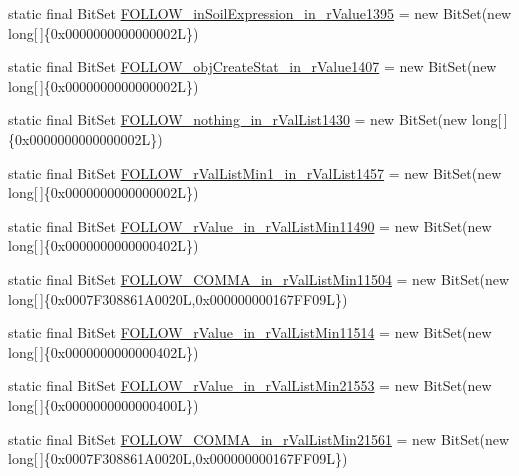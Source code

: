 \begin{DoxyCompactItemize}
\item 
static final Bit\-Set \hyperlink{classorg_1_1tzi_1_1use_1_1parser_1_1soil_1_1_soil_parser_aa564caac44be0568f6da097244165f9d}{F\-O\-L\-L\-O\-W\-\_\-in\-Soil\-Expression\-\_\-in\-\_\-r\-Value1395} = new Bit\-Set(new long\mbox{[}$\,$\mbox{]}\{0x0000000000000002\-L\})
\item 
static final Bit\-Set \hyperlink{classorg_1_1tzi_1_1use_1_1parser_1_1soil_1_1_soil_parser_a439c89ec7d9492b5d34920bc38cb5c40}{F\-O\-L\-L\-O\-W\-\_\-obj\-Create\-Stat\-\_\-in\-\_\-r\-Value1407} = new Bit\-Set(new long\mbox{[}$\,$\mbox{]}\{0x0000000000000002\-L\})
\item 
static final Bit\-Set \hyperlink{classorg_1_1tzi_1_1use_1_1parser_1_1soil_1_1_soil_parser_ac2596d2a2d47246dd1fdd571ab1f0412}{F\-O\-L\-L\-O\-W\-\_\-nothing\-\_\-in\-\_\-r\-Val\-List1430} = new Bit\-Set(new long\mbox{[}$\,$\mbox{]}\{0x0000000000000002\-L\})
\item 
static final Bit\-Set \hyperlink{classorg_1_1tzi_1_1use_1_1parser_1_1soil_1_1_soil_parser_adf6959ab316b6d7b5355a941fbbb2a72}{F\-O\-L\-L\-O\-W\-\_\-r\-Val\-List\-Min1\-\_\-in\-\_\-r\-Val\-List1457} = new Bit\-Set(new long\mbox{[}$\,$\mbox{]}\{0x0000000000000002\-L\})
\item 
static final Bit\-Set \hyperlink{classorg_1_1tzi_1_1use_1_1parser_1_1soil_1_1_soil_parser_a4e09417905fc66289fce0f0da964a46a}{F\-O\-L\-L\-O\-W\-\_\-r\-Value\-\_\-in\-\_\-r\-Val\-List\-Min11490} = new Bit\-Set(new long\mbox{[}$\,$\mbox{]}\{0x0000000000000402\-L\})
\item 
static final Bit\-Set \hyperlink{classorg_1_1tzi_1_1use_1_1parser_1_1soil_1_1_soil_parser_a86698631d1f5e8ab8259fcbd933c4567}{F\-O\-L\-L\-O\-W\-\_\-\-C\-O\-M\-M\-A\-\_\-in\-\_\-r\-Val\-List\-Min11504} = new Bit\-Set(new long\mbox{[}$\,$\mbox{]}\{0x0007\-F308861\-A0020\-L,0x000000000167\-F\-F09\-L\})
\item 
static final Bit\-Set \hyperlink{classorg_1_1tzi_1_1use_1_1parser_1_1soil_1_1_soil_parser_a5fad58468170eda7af8d3bff2a51ad6c}{F\-O\-L\-L\-O\-W\-\_\-r\-Value\-\_\-in\-\_\-r\-Val\-List\-Min11514} = new Bit\-Set(new long\mbox{[}$\,$\mbox{]}\{0x0000000000000402\-L\})
\item 
static final Bit\-Set \hyperlink{classorg_1_1tzi_1_1use_1_1parser_1_1soil_1_1_soil_parser_a63e08412670da08bedf158a385afedaf}{F\-O\-L\-L\-O\-W\-\_\-r\-Value\-\_\-in\-\_\-r\-Val\-List\-Min21553} = new Bit\-Set(new long\mbox{[}$\,$\mbox{]}\{0x0000000000000400\-L\})
\item 
static final Bit\-Set \hyperlink{classorg_1_1tzi_1_1use_1_1parser_1_1soil_1_1_soil_parser_a2c2921676cadafcd205b31492c19dc03}{F\-O\-L\-L\-O\-W\-\_\-\-C\-O\-M\-M\-A\-\_\-in\-\_\-r\-Val\-List\-Min21561} = new Bit\-Set(new long\mbox{[}$\,$\mbox{]}\{0x0007\-F308861\-A0020\-L,0x000000000167\-F\-F09\-L\})

\end{DoxyCompactItemize}
